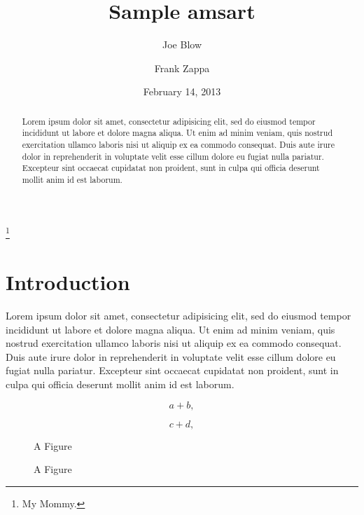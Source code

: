 \documentclass{amsart}
\theoremstyle{definition}
\theoremstyle{remark}
\numberwithin{equation}{section}
\begin{document}
\title{Sample amsart}
\author{Joe Blow}
\address{Somewhere, USA}
\thanks{My Mommy.}

\author{Frank Zappa}
\address{Baltimore}



\date{February 14, 2013}


\begin{abstract}
Lorem ipsum dolor sit amet, consectetur adipisicing elit, sed do eiusmod tempor incididunt ut labore et dolore magna aliqua. Ut enim ad minim veniam, quis nostrud exercitation ullamco laboris nisi ut aliquip ex ea commodo consequat. Duis aute irure dolor in reprehenderit in voluptate velit esse cillum dolore eu fugiat nulla pariatur. Excepteur sint occaecat cupidatat non proident, sunt in culpa qui officia deserunt mollit anim id est laborum.
\end{abstract}

\maketitle

\section{Introduction}
Lorem ipsum dolor sit amet, consectetur adipisicing elit, sed do eiusmod tempor incididunt ut labore et dolore magna aliqua. Ut enim ad minim veniam, quis nostrud exercitation ullamco laboris nisi ut aliquip ex ea commodo consequat. Duis aute irure dolor in reprehenderit in voluptate velit esse cillum dolore eu fugiat nulla pariatur. Excepteur sint occaecat cupidatat non proident, sunt in culpa qui officia deserunt mollit anim id est laborum.

\begin{equation}
 a + b,
\end{equation}

\begin{equation}
 c + d,
\end{equation}

\begin{figure}
\begin{centering}
A Figure\\
\end{centering}
\caption{A Figure}
\end{figure}
\end{document}
